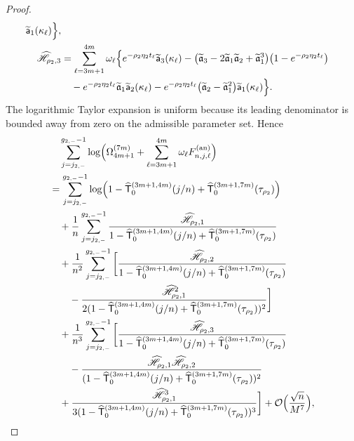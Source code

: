 \documentclass[a4paper]{article}
\numberwithin{equation}{section}
\begin{document}
\begin{proof}
\begin{align*}
\widetilde{\mathsf{a}}_{1}(\kappa_{\ell})
\Bigr\},
\\
\widehat{\mathscr{H}}_{\rho_2,3}
&=\sum_{\ell=3m+1}^{4m}\omega_{\ell}
\Bigl\{e^{-\rho_2\eta_2t_{\ell}}
\widetilde{\mathsf{a}}_{3}(\kappa_{\ell})
-\bigl( 
\widetilde{\mathfrak{a}}_3-2\widetilde{\mathfrak{a}}_1\widetilde{\mathfrak{a}}_2+\widetilde{\mathfrak{a}}_1^3
\bigr)\bigl(1-e^{-\rho_2\eta_2t_{\ell}}\bigr)
\\
&\quad 
-e^{-\rho_2\eta_2t_{\ell}}
\widetilde{\mathfrak{a}}_1
\widetilde{\mathsf{a}}_{2}(\kappa_{\ell})
-e^{-\rho_2\eta_2t_{\ell}}\bigl(\widetilde{\mathfrak{a}}_2-\widetilde{\mathfrak{a}}_1^2\bigr)
\widetilde{\mathsf{a}}_{1}(\kappa_{\ell})
\Bigr\}.
\end{align*} 
The logarithmic Taylor expansion is uniform because its leading denominator is
bounded away from zero on the admissible parameter set.  Hence
\begin{align*}
&\quad \sum_{j=j_{2,-}}^{g_{2,-}-1}\log\Bigl(\Omega_{4m+1}^{(7m)}+\sum_{\ell=3m+1}^{4m}\omega_{\ell}F_{n,j,\ell}^{(\mathrm{an})}\Bigr)
\\
&=
\sum_{j=j_{2,-}}^{g_{2,-}-1}
\log\Bigl(1-\widehat{\mathsf{T}}_0^{(3m+1,4m)}(j/n)+\widehat{\mathsf{T}}_0^{(3m+1,7m)}(\tau_{\rho_2})\Bigr)
\\
&\quad+
\frac{1}{n}
\sum_{j=j_{2,-}}^{g_{2,-}-1}\frac{\widehat{\mathscr{H}}_{\rho_2,1}}{1-\widehat{\mathsf{T}}_0^{(3m+1,4m)}(j/n)+\widehat{\mathsf{T}}_0^{(3m+1,7m)}(\tau_{\rho_2})}
\\
&\quad 
+
\frac{1}{n^2}\sum_{j=j_{2,-}}^{g_{2,-}-1}
\bigg[
\frac{\widehat{\mathscr{H}}_{\rho_2,2}}{1-\widehat{\mathsf{T}}_0^{(3m+1,4m)}(j/n)+\widehat{\mathsf{T}}_0^{(3m+1,7m)}(\tau_{\rho_2})}
\\
&\qquad-\frac{\widehat{\mathscr{H}}_{\rho_2,1}^2}{2(1-\widehat{\mathsf{T}}_0^{(3m+1,4m)}(j/n)+\widehat{\mathsf{T}}_0^{(3m+1,7m)}(\tau_{\rho_2}))^2}
\bigg]
\\
&\quad
+\frac{1}{n^3}\sum_{j=j_{2,-}}^{g_{2,-}-1}
\bigg[
\frac{\widehat{\mathscr{H}}_{\rho_2,3}}{1-\widehat{\mathsf{T}}_0^{(3m+1,4m)}(j/n)+\widehat{\mathsf{T}}_0^{(3m+1,7m)}(\tau_{\rho_2})}
\\
&\qquad-\frac{\widehat{\mathscr{H}}_{\rho_2,1}\widehat{\mathscr{H}}_{\rho_2,2}}{(1-\widehat{\mathsf{T}}_0^{(3m+1,4m)}(j/n)+\widehat{\mathsf{T}}_0^{(3m+1,7m)}(\tau_{\rho_2}))^2}
\\
&\quad 
+\frac{\widehat{\mathscr{H}}_{\rho_2,1}^3}{3(1-\widehat{\mathsf{T}}_0^{(3m+1,4m)}(j/n)+\widehat{\mathsf{T}}_0^{(3m+1,7m)}(\tau_{\rho_2}))^3}
\bigg]+\mathcal{O}\Bigl(\frac{\sqrt{n}}{M^7}\Bigr),

\end{align*}
\end{proof}
\end{document}
